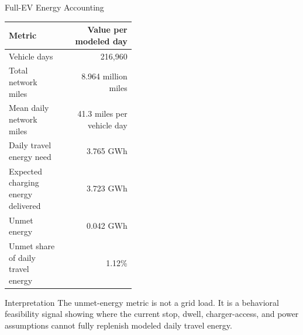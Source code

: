 \documentclass[aspectratio=169]{beamer}
\newcommand{\gwh}{\mathrm{GWh}}
\begin{document}

\begin{frame}{Full-EV Energy Accounting}
\small
\begin{tabular}{p{0.43\linewidth}r}
\toprule
\textbf{Metric} & \textbf{Value per modeled day} \\
\midrule
Vehicle days & 216,960 \\
Total network miles & 8.964 million miles \\
Mean daily network miles & 41.3 miles per vehicle day \\
Daily travel energy need & 3.765 \(\gwh\) \\
Expected charging energy delivered & 3.723 \(\gwh\) \\
Unmet energy & 0.042 \(\gwh\) \\
Unmet share of daily travel energy & 1.12\% \\
\bottomrule
\end{tabular}

\vspace{0.8em}
\begin{block}{Interpretation}
The unmet-energy metric is not a grid load. It is a behavioral feasibility signal showing where the current stop, dwell, charger-access, and power assumptions cannot fully replenish modeled daily travel energy.
\end{block}
\end{frame}
\end{document}
